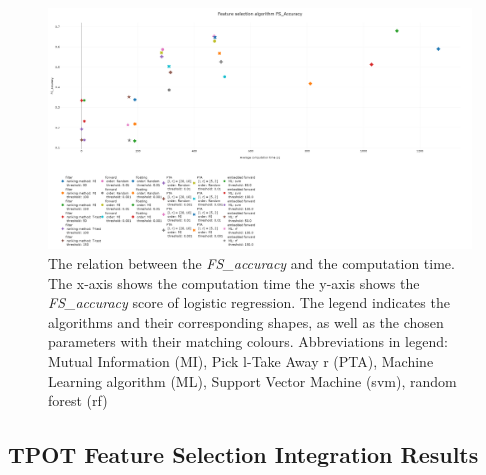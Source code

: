 \documentclass[10pt,a4paper]{report}
\begin{document}
	\begin{figure}[H]
		\centering
		\includegraphics[angle=90,height=1.4\textwidth]{FS_Accuracy_99.png}
		\caption{The relation between the \textit{FS\_accuracy} and the computation time. The x-axis shows the computation time the y-axis shows the \textit{FS\_accuracy} score of logistic regression. The legend indicates the algorithms and their corresponding shapes, as well as the chosen parameters with their matching colours. Abbreviations in legend: Mutual Information (MI), Pick l-Take Away r (PTA), Machine Learning algorithm (ML), Support Vector Machine (svm), random forest (rf)}
		\label{fig:Comp_Time_FS_Acc}
	\end{figure}
	
	\subsection{TPOT Feature Selection Integration Results}
	
\end{document}
